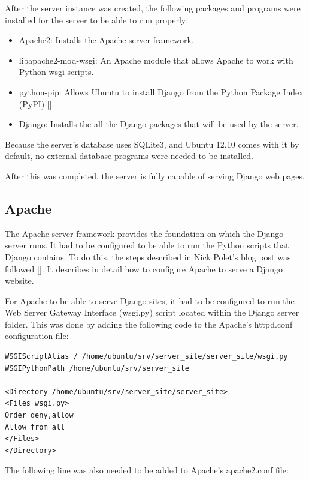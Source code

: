 After the server instance was created, the following
packages and programs were installed for the server to be able to run properly:

\begin{itemize}
  \item Apache2: Installs the Apache server framework.
  \item libapache2-mod-wsgi: An Apache module that allows Apache to work with Python wsgi
  scripts.
  \item python-pip: Allows Ubuntu to install Django from the Python Package Index (PyPI)
  [\cite{website:pypi}].
  \item Django: Installs the all the Django packages that will be used by the server. 
\end{itemize}

Because the server's database uses SQLite3, and Ubuntu 12.10 comes with it by default, no
external database programs were needed to be installed. 

After this was completed, the server is fully capable of serving Django web
pages.

\subsection{Apache}

The Apache server framework provides the foundation on which the Django server runs. It had to
be configured to be able to run the Python scripts that Django contains. To do this, the steps
described in Nick Polet's blog post was followed [\cite{article:apache-setup}]. It describes
in detail how to configure Apache to serve a Django website.

For Apache to be able to serve Django sites, it had to be configured to run the Web Server
Gateway Interface (wsgi.py) script located within the Django server folder. This was done by
adding the following code to the Apache's httpd.conf configuration file:

\begin{verbatim}
WSGIScriptAlias / /home/ubuntu/srv/server_site/server_site/wsgi.py
WSGIPythonPath /home/ubuntu/srv/server_site

<Directory /home/ubuntu/srv/server_site/server_site>
<Files wsgi.py>
Order deny,allow
Allow from all
</Files>
</Directory>
\end{verbatim}

The following line was also needed to be added to Apache's apache2.conf file:

